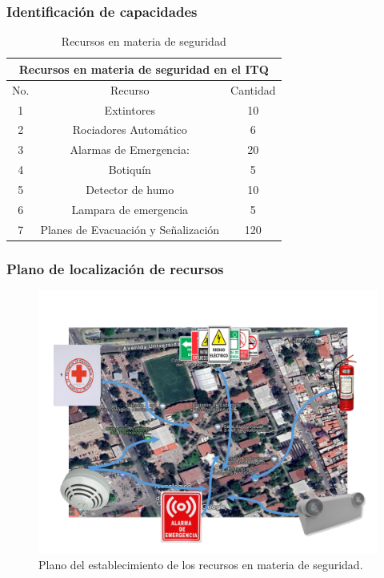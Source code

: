     \subsubsection{Identificación de capacidades}
    
    \begin{table}[H]
        \centering
        \caption{Recursos en materia de seguridad}
        \begin{tabular}{c c c }
        \hline
        \multicolumn{3}{c}{Recursos en materia de seguridad en el ITQ}\\
        \hline
             No.& Recurso & Cantidad  \\
        \hline
             1& Extintores & 10  \\
        \hline
             2& Rociadores Automático & 6 \\
        \hline
             3& Alarmas de Emergencia: & 20 \\
        \hline
             4& Botiquín & 5  \\
        \hline
             5& Detector de humo & 10 \\
        \hline
             6& Lampara de emergencia & 5 \\
        \hline
             7& Planes de Evacuación y Señalización & 120 \\
        \hline     
        \end{tabular}
        \label{tab:inventario}
    \end{table}
    \subsubsection{Plano de localización de recursos}
    \begin{figure}[H]
        \centering
        \includegraphics[trim = {20mm 20mm 10mm 26mm},clip,scale=0.30]{1/img/plano..pdf}
        \caption{Plano del establecimiento de los recursos en materia de seguridad. }
        \label{fig:plano.}
    \end{figure}

